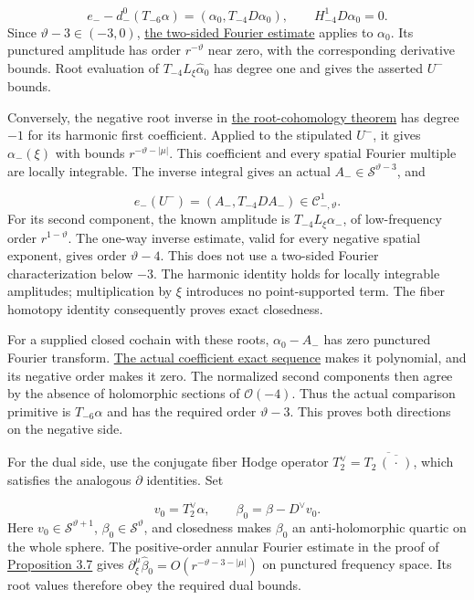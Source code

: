 \documentclass[
  english,
  11pt,
  reqno]{amsart}
\begin{document}
\label{eq:online-negative-weighted-hodge-normalization}
\[
e_--d_-^0(T_{-6}\alpha)
=(\alpha_0,T_{-4}D\alpha_0),
\qquad H^1_{-4}D\alpha_0=0 .
\] Since \(\vartheta-3\in(-3,0)\),
\hyperref[lem:online-decay-fourier-isomorphism]{the two-sided Fourier
estimate} applies to \(\alpha_0\). Its punctured amplitude has order
\(r^{-\vartheta}\) near zero, with the corresponding derivative bounds.
Root evaluation of \(T_{-4}L_\xi\widehat\alpha_0\) has degree one and
gives the asserted \(U^-\) bounds.

Conversely, the negative root inverse in
\hyperref[thm:online-moderate-root-cohomology]{the root-cohomology
theorem} has degree \(-1\) for its harmonic first coefficient. Applied
to the stipulated \(U^-\), it gives \(\alpha_-(\xi)\) with bounds
\(r^{-\vartheta-|\mu|}\). This coefficient and every spatial Fourier
multiple are locally integrable. The inverse integral gives an actual
\(A_-\in\mathscr S^{\vartheta-3}\), and

\label{eq:online-negative-dual-selected-negative-representative}
\[
e_-(U^-)
=(A_-,T_{-4}D A_-)
\in\mathscr C_{-,\vartheta}^1 .
\] For its second component, the known amplitude is
\(T_{-4}L_\xi\alpha_-\), of low-frequency order \(r^{1-\vartheta}\). The
one-way inverse estimate, valid for every negative spatial exponent,
gives order \(\vartheta-4\). This does not use a two-sided Fourier
characterization below \(-3\). The harmonic identity holds for locally
integrable amplitudes; multiplication by \(\xi\) introduces no
point-supported term. The fiber homotopy identity consequently proves
exact closedness.

For a supplied closed cochain with these roots, \(\alpha_0-A_-\) has
zero punctured Fourier transform.
\hyperref[prop:online-actual-coefficient-exact-sequence]{The actual
coefficient exact sequence} makes it polynomial, and its negative order
makes it zero. The normalized second components then agree by the
absence of holomorphic sections of \(\mathcal O(-4)\). Thus the actual
comparison primitive is \(T_{-6}\alpha\) and has the required order
\(\vartheta-3\). This proves both directions on the negative side.

For the dual side, use the conjugate fiber Hodge operator
\(T_2^\vee=\overline{T_2\,\overline{(\,\cdot\,)}}\), which satisfies the
analogous \(\partial\) identities. Set

\label{eq:online-dual-positive-hodge-normalization} \[
v_0=T_2^\vee\alpha,\qquad
\beta_0=\beta-D^\vee v_0.
\] Here \(v_0\in\mathscr S^{\vartheta+1}\),
\(\beta_0\in\mathscr S^\vartheta\), and closedness makes \(\beta_0\) an
anti-holomorphic quartic on the whole sphere. The positive-order annular
Fourier estimate in the proof of
\hyperref[prop:online-actual-coefficient-exact-sequence]{Proposition
3.7} gives \(\partial_\xi^\mu\widehat\beta_0=O(r^{-\vartheta-3-|\mu|})\)
on punctured frequency space. Its root values therefore obey the
required dual bounds.
\end{document}
